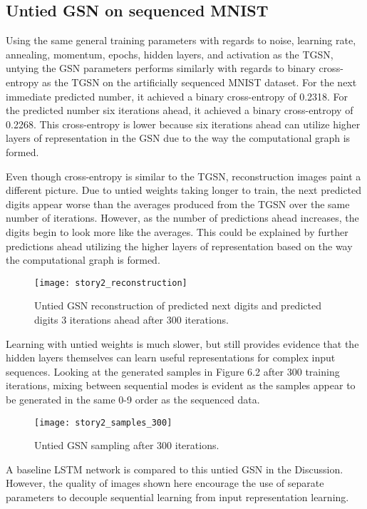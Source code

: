\subsection{Untied GSN on sequenced MNIST}

Using the same general training parameters with regards to noise, learning rate, annealing, momentum, epochs, hidden layers, and activation as the TGSN, untying the GSN parameters performs similarly with regards to binary cross-entropy as the TGSN on the artificially sequenced MNIST dataset. For the next immediate predicted number, it achieved a binary cross-entropy of 0.2318.  For the predicted number six iterations ahead, it achieved a binary cross-entropy of 0.2268. This cross-entropy is lower because six iterations ahead can utilize higher layers of representation in the GSN due to the way the computational graph is formed.

Even though cross-entropy is similar to the TGSN, reconstruction images paint a different picture. Due to untied weights taking longer to train, the next predicted digits appear worse than the averages produced from the TGSN over the same number of iterations. However, as the number of predictions ahead increases, the digits begin to look more like the averages. This could be explained by further predictions ahead utilizing the higher layers of representation based on the way the computational graph is formed.

\begin{figure}[h!]
  \centering
    \texttt{[image: story2\_reconstruction]}
\caption{Untied GSN reconstruction of predicted next digits and predicted digits 3 iterations ahead after 300 iterations.}
\end{figure}

Learning with untied weights is much slower, but still provides evidence that the hidden layers themselves can learn useful representations for complex input sequences. Looking at the generated samples in Figure 6.2 after 300 training iterations, mixing between sequential modes is evident as the samples appear to be generated in the same 0-9 order as the sequenced data.

\begin{figure}[h!]
  \centering
    \texttt{[image: story2\_samples\_300]}
\caption{Untied GSN sampling after 300 iterations.}
\end{figure}

A baseline LSTM network is compared to this untied GSN in the Discussion. However, the quality of images shown here encourage the use of separate parameters to decouple sequential learning from input representation learning.

